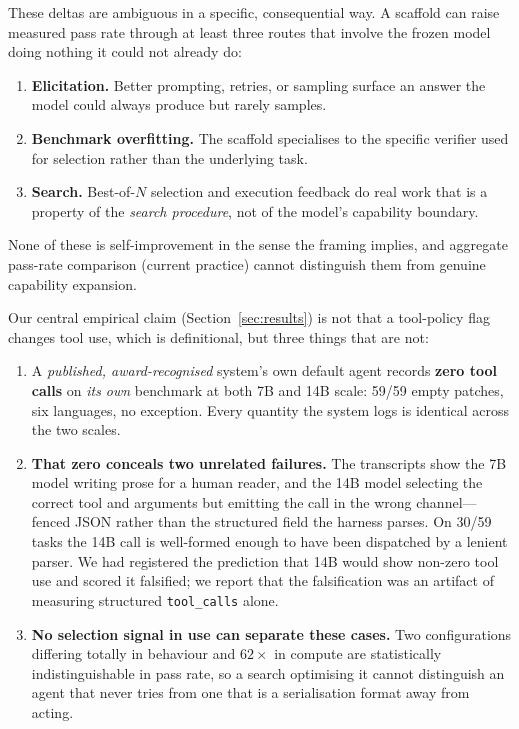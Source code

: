 \documentclass{article}
\begin{document}
These deltas are ambiguous in a specific, consequential way. A scaffold can
raise measured pass rate through at least three routes that involve the frozen
model doing nothing it could not already do:

\begin{enumerate}
\item \textbf{Elicitation.} Better prompting, retries, or sampling surface an
  answer the model could always produce but rarely samples.
\item \textbf{Benchmark overfitting.} The scaffold specialises to the specific
  verifier used for selection rather than the underlying task.
\item \textbf{Search.} Best-of-$N$ selection and execution feedback do real work
  that is a property of the \emph{search procedure}, not of the model's
  capability boundary.
\end{enumerate}

None of these is self-improvement in the sense the framing implies, and
aggregate pass-rate comparison (current practice) cannot distinguish them from
genuine capability expansion.

Our central empirical claim (Section~\ref{sec:results}) is not that a
tool-policy flag changes tool use, which is definitional, but three
things that are not:

\begin{enumerate}
\item A \emph{published, award-recognised} system's own default agent records
  \textbf{zero tool calls} on \emph{its own} benchmark at both 7B and 14B
  scale: 59/59 empty patches, six languages, no exception. Every quantity
  the system logs is identical across the two scales.
\item \textbf{That zero conceals two unrelated failures.} The transcripts
  show the 7B model writing prose for a human reader, and the 14B model
  selecting the correct tool and arguments but emitting the call in the
  wrong channel---fenced JSON rather than the structured field the harness
  parses. On 30/59 tasks the 14B call is well-formed enough to have been
  dispatched by a lenient parser. We had registered the prediction that 14B
  would show non-zero tool use and scored it falsified; we report that the
  falsification was an artifact of measuring structured
  \texttt{tool\_calls} alone.
\item \textbf{No selection signal in use can separate these cases.} Two
  configurations differing totally in behaviour and $62\times$ in compute
  are statistically indistinguishable in pass rate, so a search optimising
  it cannot distinguish an agent that never tries from one that is a
  serialisation format away from acting.
\end{enumerate}
\end{document}
